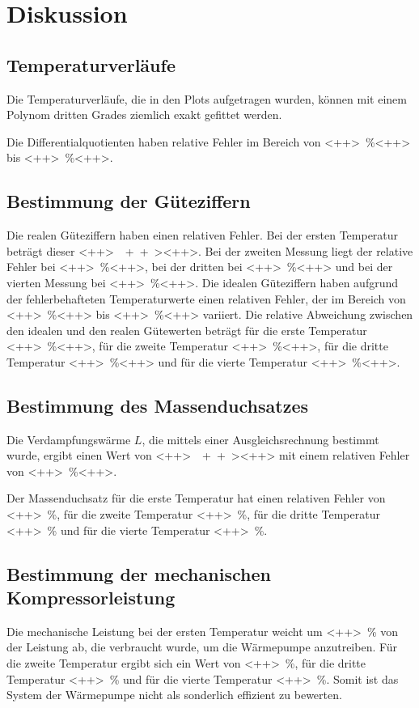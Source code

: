 \section{Diskussion}
\label{sec:Diskussion}

\subsection{Temperaturverläufe}
Die Temperaturverläufe, die in den Plots aufgetragen wurden, können mit einem 
Polynom dritten Grades ziemlich exakt gefittet werden. 

\noindent Die Differentialquotienten haben relative Fehler im Bereich von \SI{<++>}{\percent}<++> 
bis \SI{<++>}{\percent}<++>.

\subsection{Bestimmung der Güteziffern}
Die realen Güteziffern haben einen relativen Fehler. Bei der ersten Temperatur beträgt 
dieser \SI{<++>}{\<++>}<++>. Bei der zweiten Messung liegt der relative Fehler bei 
\SI{<++>}{\percent}<++>, bei der dritten bei \SI{<++>}{\percent}<++> und bei der 
vierten Messung bei \SI{<++>}{\percent}<++>. 
Die idealen Güteziffern haben aufgrund der fehlerbehafteten Temperaturwerte einen 
relativen Fehler, der im Bereich von \SI{<++>}{\percent}<++> bis \SI{<++>}{\percent}<++> 
variiert. %
Die relative Abweichung zwischen den idealen und den realen Gütewerten beträgt für die 
erste Temperatur \SI{<++>}{\percent}<++>, für die zweite Temperatur 
\SI{<++>}{\percent}<++>, für die dritte Temperatur \SI{<++>}{\percent}<++> und für die 
vierte Temperatur \SI{<++>}{\percent}<++>.


\subsection{Bestimmung des Massenduchsatzes}
Die Verdampfungswärme $L$, die mittels einer Ausgleichsrechnung bestimmt wurde, 
ergibt einen Wert von \SI{<++>}{\<++>}<++> mit einem relativen Fehler von 
\SI{<++>}{\percent}<++>. %

\noindent Der Massenduchsatz für die erste Temperatur hat einen relativen Fehler von 
\SI{<++>}{\percent}, für die zweite Temperatur \SI{<++>}{\percent}, für die dritte 
Temperatur \SI{<++>}{\percent} und für die vierte Temperatur \SI{<++>}{\percent}. 

\subsection{Bestimmung der mechanischen Kompressorleistung}
Die mechanische Leistung bei der ersten Temperatur weicht um 
\SI{<++>}{\percent} von der Leistung ab, die verbraucht wurde, um die Wärmepumpe 
anzutreiben. Für die zweite Temperatur ergibt sich ein Wert von \SI{<++>}{\percent}, 
für die dritte Temperatur \SI{<++>}{\percent} und für die vierte Temperatur 
\SI{<++>}{\percent}. 
Somit ist das System der Wärmepumpe nicht als sonderlich effizient zu bewerten.